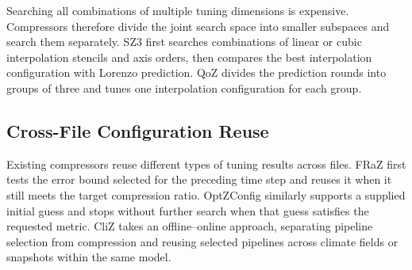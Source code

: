 Searching all combinations of multiple tuning dimensions is expensive. Compressors therefore divide the joint search space into smaller subspaces and search them separately. SZ3 first searches combinations of linear or cubic interpolation stencils and axis orders, then compares the best interpolation configuration with Lorenzo prediction. QoZ divides the prediction rounds into groups of three and tunes one interpolation configuration for each group.

\subsection{Cross-File Configuration Reuse}
\label{sec:related-work:reuse}

Existing compressors reuse different types of tuning results across files. FRaZ first tests the error bound selected for the preceding time step and reuses it when it still meets the target compression ratio. OptZConfig similarly supports a supplied initial guess and stops without further search when that guess satisfies the requested metric. CliZ takes an offline--online approach, separating pipeline selection from compression and reusing selected pipelines across climate fields or snapshots within the same model.


